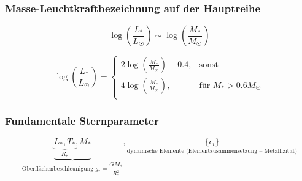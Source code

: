 \subsubsection{Masse-Leuchtkraftbezeichnung auf der Hauptreihe}
\[ \log\left(\frac{L_*}{L_{\astrosun}}\right) \sim \log \left(\frac{M_*}{M_{\astrosun}}\right) \]

\[
    \boxed{\log\left(\frac{L_*}{L_{\astrosun}}\right) = \begin{cases}
        2 \log \left(\frac{M_*}{M_{\astrosun}}\right) - 0.4, & \text{sonst} \\
        4 \log \left(\frac{M_*}{M_{\astrosun}}\right), & \text{für $M_* > 0.6 M_{\astrosun}$} \\
    \end{cases}}
\]


\subsubsection{Fundamentale Sternparameter}

\[ \underbrace{\underbrace{L_*, T_*}_{R_*}, M_*}_{\text{Oberflächenbeschleunigung $g_* = \dfrac{GM_*}{R_*^2}$}}, \underset{\text{dynamische Elemente (Elementzusammensetzung -- Metallizität)}}{\{\epsilon_i\}} \]

